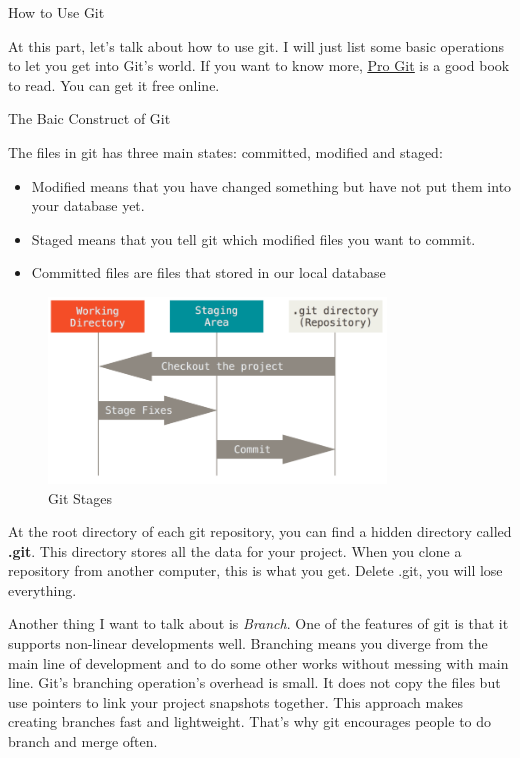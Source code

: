 \documentclass[12pt, a4papaer]{article}
\begin{document}
\begin{section}{How to Use Git}

At this part, let's talk about how to use git. I will just list some basic
operations to let you get into Git's world. If you want to know more,
\href{https://git-scm.com/book/en/v2}{\underline{Pro Git}} is a good book to read.
You can get it free online.

\begin{subsection}{The Baic Construct of Git}

The files in git has three main states: committed, modified and staged:
\begin{itemize}
\item Modified means that you have changed something but have not put them into your database yet.
\item Staged means that you tell git which modified files you want to commit.
\item Committed files are files that stored in our local database
\end{itemize}

\begin{figure}[h]
    \centering
    \includegraphics[width=0.8\textwidth]{images/git-stages}
    \caption{Git Stages}
\end{figure}

At the root directory of each git repository, you can find a hidden directory
called \textbf{.git}. This directory stores all the data for your project. When
you clone a repository from another computer, this is what you get. Delete .git,
you will lose everything.

Another thing I want to talk about is \textit{Branch}. One of the features of
git is that it supports non-linear developments well. Branching means you
diverge from the main line of development and to do some other works without
messing with main line. Git's branching operation's overhead is small. It does
not copy the files but use pointers to link your project snapshots together.
This approach makes creating branches fast and lightweight. That's why git
encourages people to do branch and merge often.


\end{subsection}
\end{section}
\end{document}
